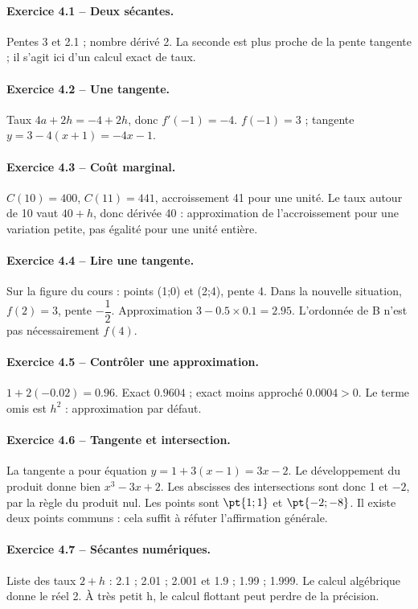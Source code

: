 \paragraph{Exercice 4.1 -- Deux sécantes.} Pentes 3 et \num{2,1} ; nombre dérivé 2. La seconde est plus proche de la pente tangente ; il s’agit ici d’un calcul exact de taux.
\paragraph{Exercice 4.2 -- Une tangente.} Taux $4a+2h=-4+2h$, donc $f\prime(-1)=-4$. $f(-1)=3$ ; tangente $y=3-4(x+1)=-4x-1$.
\paragraph{Exercice 4.3 -- Coût marginal.} $C(10)=400$, $C(11)=441$, accroissement 41 pour une unité. Le taux autour de 10 vaut $40+h$, donc dérivée 40 : approximation de l’accroissement pour une variation petite, pas égalité pour une unité entière.
\paragraph{Exercice 4.4 -- Lire une tangente.} Sur la figure du cours : points (1;0) et (2;4), pente 4. Dans la nouvelle situation, $f(2)=3$, pente $-\dfrac{1}{2}$. Approximation $3-\num{0,5}\times\num{0,1}=\num{2,95}$. L’ordonnée de B n’est pas nécessairement $f(4)$.
\paragraph{Exercice 4.5 -- Contrôler une approximation.} $1+2(-\num{0,02})=\num{0,96}$. Exact $\num{0,9604}$ ; exact moins approché $\num{0,0004}>0$. Le terme omis est $h^2$ : approximation par défaut.
\paragraph{Exercice 4.6 -- Tangente et intersection.} La tangente a pour équation $y=1+3(x-1)=3x-2$. Le développement du produit donne bien $x^3-3x+2$. Les abscisses des intersections sont donc 1 et $-2$, par la règle du produit nul. Les points sont $\pt{1;1}$ et $\pt{-2;-8}$. Il existe deux points communs : cela suffit à réfuter l’affirmation générale.
\paragraph{Exercice 4.7 -- Sécantes numériques.} Liste des taux $2+h$ : \num{2,1} ; \num{2,01} ; \num{2,001} et \num{1,9} ; \num{1,99} ; \num{1,999}. Le calcul algébrique donne le réel 2. À très petit h, le calcul flottant peut perdre de la précision.
